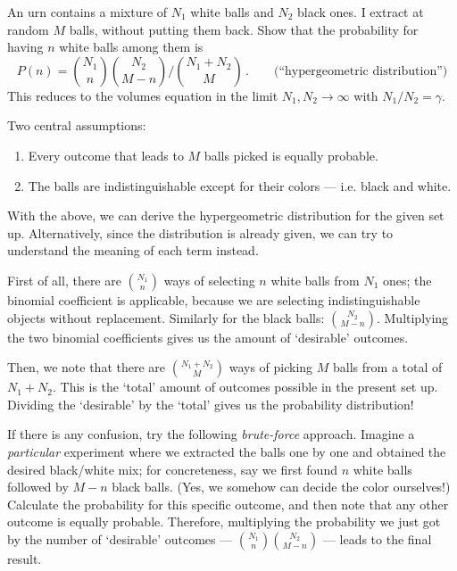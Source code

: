 

An urn contains a mixture of $N_1$ white balls and $N_2$ black ones.
I extract at random $M$ balls, without putting them back.
Show that the probability for having $n$ white balls among them is
\begin{equation*}
P(n) = \binom{N_1}{n} \binom{N_2}{M-n} / \binom{N_1 + N_2}{M} \, . \qquad \text{(``hypergeometric distribution'')}
\end{equation*}
This reduces to the volumes equation in the limit $N_1, N_2 \rightarrow \infty$ with $N_1/N_2 = \gamma$.

Two central assumptions: 
\begin{enumerate}
\item Every outcome that leads to $M$ balls picked is equally probable.
\item The balls are indistinguishable except for their colors --- i.e. black and white.
\end{enumerate}
With the above, we can derive the hypergeometric distribution for the given set up. Alternatively, since the distribution is already given, we can try to understand the meaning of each term instead.

First of all, there are $\binom{N_1}{n}$ ways of selecting $n$ white balls from $N_1$ ones; the binomial coefficient is applicable, because we are selecting indistinguishable objects without replacement. Similarly for the black balls: $\binom{N_2}{M-n}$. Multiplying the two binomial coefficients gives us the amount of `desirable' outcomes. 

Then, we note that there are $\binom{N_{1} + N_{2}}{M}$ ways of picking $M$ balls from a total of $N_{1} + N_{2}$. This is the `total' amount of outcomes possible in the present set up. Dividing the `desirable'  by the `total' gives us the probability distribution!

If there is any confusion, try the following \emph{brute-force} approach. Imagine a \emph{particular} experiment where we extracted the balls one by one and obtained the desired black/white mix; for concreteness, say we first found $n$ white balls followed by $M-n$ black balls. (Yes, we somehow can decide the color ourselves!) Calculate the probability for this specific outcome, and then note that any other outcome is equally probable. Therefore, multiplying the probability we just got by the number of `desirable' outcomes --- $\binom{N_1}{n} \binom{N_2}{M-n} $ --- leads to the final result.